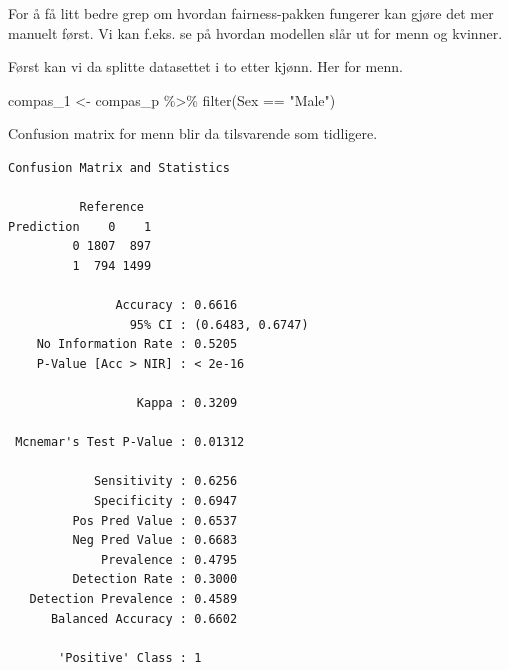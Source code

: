 \documentclass[
  letterpaper,
  DIV=11,
  numbers=noendperiod]{scrreprt}
\newenvironment{Shaded}{\begin{snugshade}}{\end{snugshade}}
\newcommand{\AttributeTok}[1]{\textcolor[rgb]{0.40,0.45,0.13}{#1}}
\newcommand{\FunctionTok}[1]{\textcolor[rgb]{0.28,0.35,0.67}{#1}}
\newcommand{\NormalTok}[1]{\textcolor[rgb]{0.00,0.23,0.31}{#1}}
\newcommand{\OtherTok}[1]{\textcolor[rgb]{0.00,0.23,0.31}{#1}}
\newcommand{\SpecialCharTok}[1]{\textcolor[rgb]{0.37,0.37,0.37}{#1}}
\newcommand{\StringTok}[1]{\textcolor[rgb]{0.13,0.47,0.30}{#1}}
\begin{document}
For å få litt bedre grep om hvordan fairness-pakken fungerer kan gjøre
det mer manuelt først. Vi kan f.eks. se på hvordan modellen slår ut for
menn og kvinner.

Først kan vi da splitte datasettet i to etter kjønn. Her for menn.

\begin{Shaded}
\begin{Highlighting}[]
\NormalTok{compas\_1 }\OtherTok{\textless{}{-}}\NormalTok{ compas\_p }\SpecialCharTok{\%\textgreater{}\%} 
  \FunctionTok{filter}\NormalTok{(Sex }\SpecialCharTok{==} \StringTok{"Male"}\NormalTok{)}
\end{Highlighting}
\end{Shaded}

Confusion matrix for menn blir da tilsvarende som tidligere.

\begin{Shaded}
\end{Shaded}

\begin{verbatim}
Confusion Matrix and Statistics

          Reference
Prediction    0    1
         0 1807  897
         1  794 1499
                                          
               Accuracy : 0.6616          
                 95% CI : (0.6483, 0.6747)
    No Information Rate : 0.5205          
    P-Value [Acc > NIR] : < 2e-16         
                                          
                  Kappa : 0.3209          
                                          
 Mcnemar's Test P-Value : 0.01312         
                                          
            Sensitivity : 0.6256          
            Specificity : 0.6947          
         Pos Pred Value : 0.6537          
         Neg Pred Value : 0.6683          
             Prevalence : 0.4795          
         Detection Rate : 0.3000          
   Detection Prevalence : 0.4589          
      Balanced Accuracy : 0.6602          
                                          
       'Positive' Class : 1               
                                          
\end{verbatim}
\end{document}
